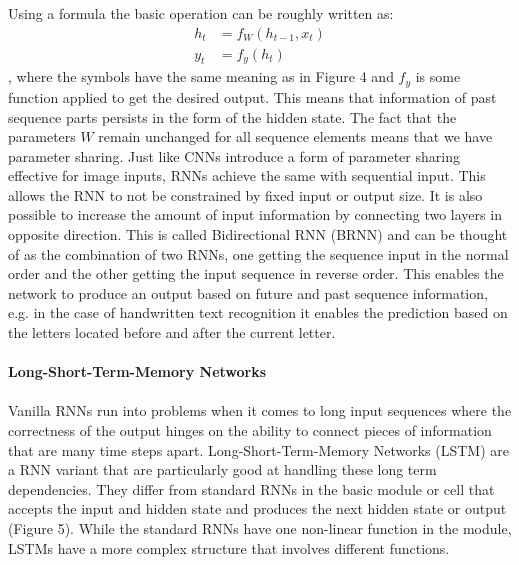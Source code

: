 \documentclass{article}
\begin{document}
Using a formula the basic operation can be roughly written as:
\[
\begin{split}
h_t &= f_W(h_{t-1}, x_t)\\
y_t &= f_y(h_t)
\end{split}
\]
, where the symbols have the same meaning as in Figure 4 and \(f_y\) is some function applied to get the desired output. This means that information of past sequence parts persists in the form of the hidden state. The fact that the parameters \(W\) remain unchanged for all sequence elements means that we have parameter sharing. Just like CNNs introduce a form of parameter sharing effective for image inputs, RNNs achieve the same with sequential input. This allows the RNN to not be constrained by fixed input or output size. It is also possible to increase the amount of input information by connecting two layers in opposite direction. This is called Bidirectional RNN (BRNN) and can be thought of as the combination of two RNNs, one getting the sequence input in the normal order and the other getting the input sequence in reverse order. This enables the network to produce an output based on future and past sequence information, e.g. in the case of handwritten text recognition it enables the prediction based on the letters located before and after the current letter.\\\\
\textbf{Long-Short-Term-Memory Networks}\\\\
Vanilla RNNs run into problems when it comes to long input sequences where the correctness of the output hinges on the ability to connect pieces of information that are many time steps apart. Long-Short-Term-Memory Networks (LSTM) are a RNN variant that are particularly good at handling these long term dependencies. They differ from standard RNNs in the basic module or cell that accepts the input and hidden state and produces the next hidden state or output (Figure 5). While the standard RNNs have one non-linear function in the module, LSTMs have a more complex structure that involves different functions.
\end{document}
